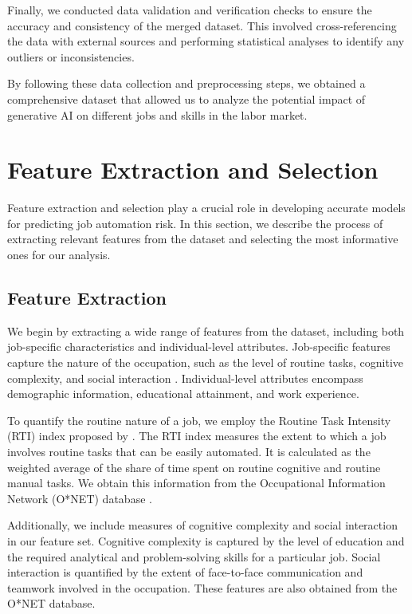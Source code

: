 \documentclass{article}
\begin{document}
Finally, we conducted data validation and verification checks to ensure the accuracy and consistency of the merged dataset. This involved cross-referencing the data with external sources and performing statistical analyses to identify any outliers or inconsistencies.

By following these data collection and preprocessing steps, we obtained a comprehensive dataset that allowed us to analyze the potential impact of generative AI on different jobs and skills in the labor market.
\section{Feature Extraction and Selection}

Feature extraction and selection play a crucial role in developing accurate models for predicting job automation risk. In this section, we describe the process of extracting relevant features from the dataset and selecting the most informative ones for our analysis.

\subsection{Feature Extraction}

We begin by extracting a wide range of features from the dataset, including both job-specific characteristics and individual-level attributes. Job-specific features capture the nature of the occupation, such as the level of routine tasks, cognitive complexity, and social interaction \cite{autor2013computerization}. Individual-level attributes encompass demographic information, educational attainment, and work experience.

To quantify the routine nature of a job, we employ the Routine Task Intensity (RTI) index proposed by \cite{autor2003skill}. The RTI index measures the extent to which a job involves routine tasks that can be easily automated. It is calculated as the weighted average of the share of time spent on routine cognitive and routine manual tasks. We obtain this information from the Occupational Information Network (O*NET) database \cite{onet}.

Additionally, we include measures of cognitive complexity and social interaction in our feature set. Cognitive complexity is captured by the level of education and the required analytical and problem-solving skills for a particular job. Social interaction is quantified by the extent of face-to-face communication and teamwork involved in the occupation. These features are also obtained from the O*NET database.
\end{document}
